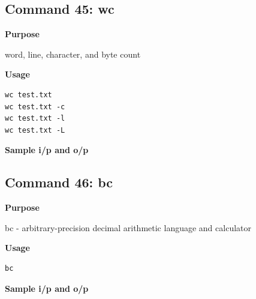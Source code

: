 \documentclass{article}
\begin{document}
\subsection{Command 45: wc} 
\textbf{Purpose}
\begin{flushleft}
 word, line, character, and byte count
\end{flushleft}
\textbf{Usage}
\begin{verbatim}
wc test.txt
wc test.txt -c
wc test.txt -l
wc test.txt -L
\end{verbatim}
\textbf{Sample i/p and o/p}
\begin{figure}[H] 
\end{figure}
\subsection{Command 46: bc} 
\textbf{Purpose}
\begin{flushleft}
       bc - arbitrary-precision decimal arithmetic language and calculator
\end{flushleft}
\textbf{Usage}
\begin{verbatim}
bc
\end{verbatim}
\textbf{Sample i/p and o/p}
\begin{figure}[H] 
\end{figure}
\end{document}
